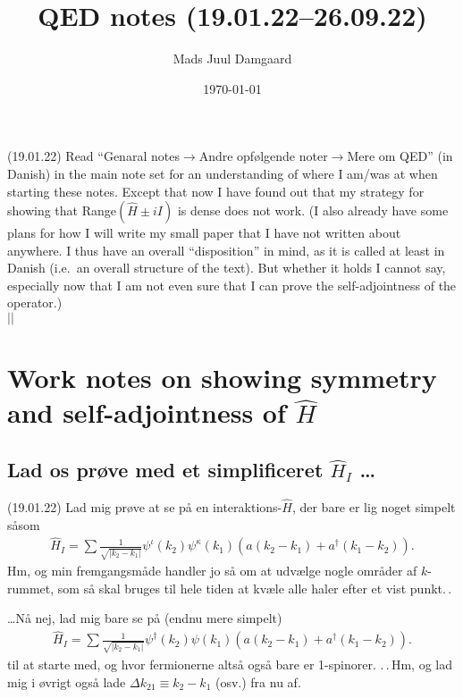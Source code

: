 \documentclass{report}
\title{QED notes (19.01.22--26.09.22)}
\author{Mads Juul Damgaard}
\date{\today}
\begin{document}
\maketitle

(19.01.22) Read ``Genaral notes$\to$Andre opfølgende noter$\to$Mere om QED'' (in Danish) in the main note set for an understanding of where I am/was at when starting these notes. Except that now I have found out that my strategy for showing that Range$(\hat H \pm i I)$ is dense does not work. (I also already have some plans for how I will write my small paper that I have not written about anywhere. I thus have an overall ``disposition'' in mind, as it is called at least in Danish (i.e.\ an overall structure of the text). But whether it holds I cannot say, especially now that I am not even sure that I can prove the self-adjointness of the operator.)
{\\\centering\noindent
	\vspace{-\baselineskip}
	\hspace{-2.5em}
	{$|$\hspace{\linewidth}\hspace{2.5em}$|$}
}

\chapter[]{Work notes on showing symmetry and self-adjointness of $\hat{H}$}


\section[]{Lad os prøve med et simplificeret $\hat H_I$ \ldots}
(19.01.22) Lad mig prøve at se på en interaktions-$\hat H$, der bare er lig noget simpelt såsom 
\begin{align}
	\hat H_I = \sum \frac{1}{\sqrt{|k_2 - k_1|}}\psi^\iota(k_2)\psi^\kappa(k_1)(a(k_2 - k_1) + a^\dagger(k_1 - k_2)).
\end{align}
Hm, og min fremgangsmåde handler jo så om at udvælge nogle områder af $k$-rummet, som så skal bruges til hele tiden at kvæle alle haler efter et vist punkt.\,. 

\ldots Nå nej, lad mig bare se på (endnu mere simpelt)
\begin{align}
\hat H_I = \sum \frac{1}{\sqrt{|k_2 - k_1|}}\psi^\dagger(k_2)\psi(k_1)(a(k_2 - k_1) + a^\dagger(k_1 - k_2)).
\end{align}
til at starte med, og hvor fermionerne altså også bare er 1-spinorer. .\,.\,Hm, og lad mig i øvrigt også lade $\Delta k_{2 1}\equiv k_2 - k_1$ (osv.) fra nu af. %
\end{document}
